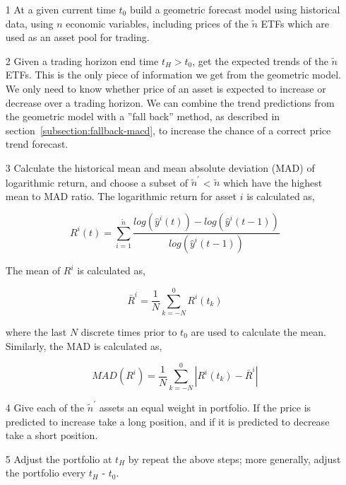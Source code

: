 \documentclass{article}
\begin{document}
\begin{itemize}

  \item[1] At a given current time $t_{0}$ build a geometric forecast
    model using historical data, using $n$ economic variables,
    including prices of the $\tilde{n}$ ETFs which are used as an asset
    pool for trading.

  \item[2] Given a trading horizon end time $t_{H} > t_{0}$, get the
    expected trends of the $\tilde{n}$ ETFs. This is the only piece of
    information we get from the geometric model. We only need to know
    whether price of an asset is expected to increase or decrease over
    a trading horizon. We can combine the trend predictions from the
    geometric model with a ''fall back'' method, as described in
    section~\ref{subsection:fallback-macd}, to increase the chance of
    a correct price trend forecast.

    \item[3] Calculate the historical mean and mean absolute deviation
      (MAD) of logarithmic return, and choose a subset of
      $\tilde{n}^{\prime}$ < $\tilde{n}$ which have the highest mean to
      MAD ratio. The logarithmic return for asset $i$ is calculated
      as,

      \begin{equation}\label{eqn:log-return}
        R^{i}(t) = \sum_{i=1}^{\tilde{n}}
        \frac{log(\hat{y}^{i}(t))-log(\hat{y}^{i}(t-1))}{log(\hat{y}^{i}(t-1))}
      \end{equation}

      The mean of $R^{i}$ is calculated as,

      \begin{equation}\label{eqn:log-return-mean}
        \bar{R}^{i} = \frac{1}{N} \sum_{k=-N}^{0} R^{i}(t_{k})
      \end{equation}

      where the last $N$ discrete times prior to $t_{0}$ are used to
      calculate the mean. Similarly, the MAD is calculated as,
      
      \begin{equation}\label{eqn:log-return-mad}
        MAD(R^{i}) = \frac{1}{N} \sum_{k=-N}^{0} |R^{i}(t_{k}) - \bar{R}^{i}|
      \end{equation}
      
  \item[4] Give each of the $\tilde{n}^{\prime}$ assets an equal
    weight in portfolio. If the price is predicted to increase take a
    long position, and if it is predicted to decrease take a short
    position.

   \item[5] Adjust the portfolio at $t_{H}$ by repeat the above steps;
     more generally, adjust the portfolio every $t_{H}$ - $t_{0}$.
      
\end{itemize}
\end{document}
